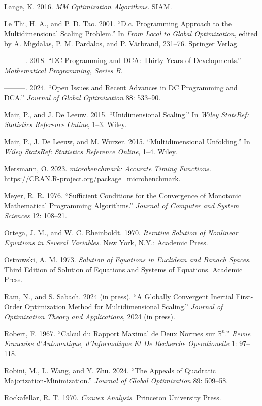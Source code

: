 \documentclass[
  12pt,
  letterpaper,
  DIV=11,
  numbers=noendperiod]{scrartcl}
\newlength{\cslhangindent}
\newenvironment{CSLReferences}[2] %
 {\begin{list}{}{%
  \setlength{\itemindent}{0pt}
  \setlength{\leftmargin}{0pt}
  \setlength{\parsep}{0pt}
  \ifodd #1
   \setlength{\leftmargin}{\cslhangindent}
   \setlength{\itemindent}{-1\cslhangindent}
  \fi
  \setlength{\itemsep}{#2\baselineskip}}}
 {\end{list}}
\begin{document}
\begin{CSLReferences}{1}{0}
Lange, K. 2016. \emph{MM Optimization Algorithms}. SIAM.

Le Thi, H. A., and P. D. Tao. 2001. {``D.c. Programming Approach to the
Multidimensional Scaling Problem.''} In \emph{From Local to Global
Optimization}, edited by A. Migdalas, P. M. Pardalos, and P. Värbrand,
231--76. Springer Verlag.

---------. 2018. {``{DC Programming and DCA: Thirty Years of
Developments}.''} \emph{Mathematical Programming, Series B}.

---------. 2024. {``Open Issues and Recent Advances in DC Programming
and DCA.''} \emph{Journal of Global Optimization} 88: 533--90.

Mair, P., and J. De Leeuw. 2015. {``{Unidimensional Scaling}.''} In
\emph{Wiley {StatsRef}: Statistics Reference Online}, 1--3. Wiley.

Mair, P., J. De Leeuw, and M. Wurzer. 2015. {``{Multidimensional
Unfolding}.''} In \emph{Wiley {StatsRef}: Statistics Reference Online},
1--4. Wiley.

Mersmann, O. 2023. \emph{{microbenchmark: Accurate Timing Functions}}.
\url{https://CRAN.R-project.org/package=microbenchmark}.

Meyer, R. R. 1976. {``{Sufficient Conditions for the Convergence of
Monotonic Mathematical Programming Algorithms}.''} \emph{Journal of
Computer and System Sciences} 12: 108--21.

Ortega, J. M., and W. C. Rheinboldt. 1970. \emph{{Iterative Solution of
Nonlinear Equations in Several Variables}}. New York, N.Y.: Academic
Press.

Ostrowski, A. M. 1973. \emph{Solution of Equations in Euclidean and
Banach Spaces}. Third Edition of Solution of Equations and Systems of
Equations. Academic Press.

Ram, N., and S. Sabach. 2024 (in press). {``A Globally Convergent
Inertial First-Order Optimization Method for Multidimensional
Scaling.''} \emph{Journal of Optimization Theory and Applications}, 2024
(in press).

Robert, F. 1967. {``{Calcul du Rapport Maximal de Deux Normes sur
\(\mathbb{R}^n\)}.''} \emph{Revue Francaise d'Automatique,
d'Informatique Et De Recherche Operationelle} 1: 97--118.

Robini, M., L. Wang, and Y. Zhu. 2024. {``The Appeals of Quadratic
Majorization-Minimization.''} \emph{Journal of Global Optimization} 89:
509--58.

Rockafellar, R. T. 1970. \emph{Convex Analysis}. Princeton University
Press.

\end{CSLReferences}
\end{document}
